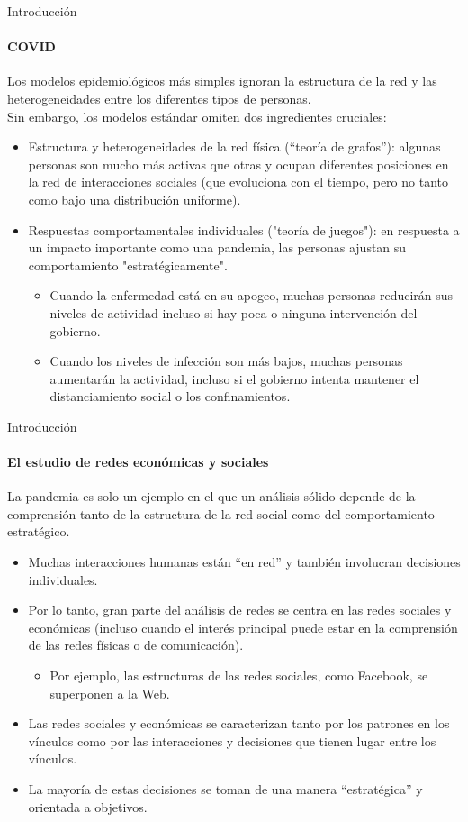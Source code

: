 \documentclass[11pt]{beamer}
\begin{document}
\begin{frame}{Introducción}
\framesubtitle{COVID}
Los modelos epidemiológicos más simples ignoran la estructura de la red y las heterogeneidades entre los diferentes tipos de personas.\\
Sin embargo, los modelos estándar omiten dos ingredientes cruciales:
\begin{itemize}
 \small   \item Estructura y heterogeneidades de la red física (“teoría de grafos”): algunas personas son mucho más activas que otras y ocupan diferentes posiciones en la red de interacciones sociales (que evoluciona con el tiempo, pero no tanto como bajo una distribución uniforme).
\item Respuestas comportamentales individuales ("teoría de juegos"): en respuesta a un impacto importante como una pandemia, las personas ajustan su comportamiento "estratégicamente".
\begin{itemize}
\footnotesize    \item Cuando la enfermedad está en su apogeo, muchas personas reducirán sus niveles de actividad incluso si hay poca o ninguna intervención del gobierno. 
    \item Cuando los niveles de infección son más bajos, muchas personas aumentarán la actividad, incluso si el gobierno intenta mantener el distanciamiento social o los confinamientos.
\end{itemize}
\end{itemize}
\end{frame}


\begin{frame}{Introducción}
    \framesubtitle{El estudio de redes económicas y sociales}
La pandemia es solo un ejemplo en el que un análisis sólido depende de la comprensión tanto de la estructura de la red social como del comportamiento estratégico.
\begin{itemize}
    \item Muchas interacciones humanas están “en red” y también involucran decisiones individuales.
\item Por lo tanto, gran parte del análisis de redes se centra en las redes sociales y económicas (incluso cuando el interés principal puede estar en la comprensión de las redes físicas o de comunicación).
\begin{itemize}
    \item Por ejemplo, las estructuras de las redes sociales, como Facebook, se superponen a la Web.
\end{itemize}
\item Las redes sociales y económicas se caracterizan tanto por los patrones en los vínculos como por las interacciones y decisiones que tienen lugar entre los vínculos.
\item La mayoría de estas decisiones se toman de una manera “estratégica” y orientada a objetivos.
\end{itemize}
\end{frame}
\end{document}
